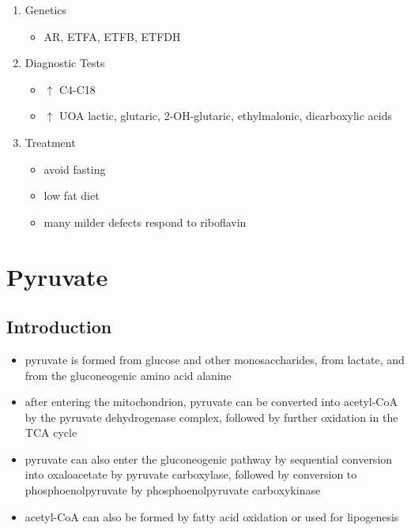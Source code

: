 \documentclass{scrartcl}
\begin{document}
\begin{enumerate}
\begin{enumerate}
\item Genetics
\label{sec:orge1ba35c}
\begin{itemize}
\item AR, ETFA, ETFB, ETFDH
\end{itemize}

\item Diagnostic Tests
\label{sec:org10bb38e}
\begin{itemize}
\item \(\uparrow\) C4-C18
\item \(\uparrow\) UOA lactic, glutaric, 2-OH-glutaric, ethylmalonic, dicarboxylic acids
\end{itemize}
\item Treatment
\label{sec:org4aea731}
\begin{itemize}
\item avoid fasting
\item low fat diet
\item many milder defects respond to riboflavin
\end{itemize}
\end{enumerate}
\end{enumerate}
\section{Pyruvate}
\label{sec:org9e63eda}
\subsection{Introduction}
\label{sec:orgff94f3d}
\begin{itemize}
\item pyruvate is formed from glucose and other monosaccharides, from
lactate, and from the gluconeogenic amino acid alanine
\item after entering the mitochondrion, pyruvate can be converted into
acetyl-CoA by the pyruvate dehydrogenase complex, followed by
further oxidation in the TCA cycle
\item pyruvate can also enter the gluconeogenic pathway by sequential
conversion into oxaloacetate by pyruvate carboxylase, followed by
conversion to phosphoenolpyruvate by phosphoenolpyruvate
carboxykinase
\item acetyl-CoA can also be formed by fatty acid oxidation or used for
lipogenesis
\end{itemize}
\end{document}
